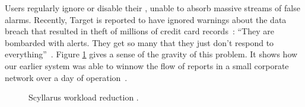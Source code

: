 Users regularly ignore or disable their {\idses}, unable to absorb
massive streams of false alarms.
Recently, Target is reported to have ignored warnings about the
data breach that resulted in theft of millions of credit
card records~\cite{TargetIgnoredIDS}:
``They are bombarded with alerts. They get so many that they just don't respond
to everything''~\cite{finkle14:_target}.
Figure
\ref{fig:workloadReduction} gives a sense of the gravity of this
problem. It shows how our earlier system was able to winnow
the 
flow of reports in a small corporate network over a day of operation~.
\begin{figure}[t]
  \centering
  \caption{Scyllarus workload reduction%
.}
  \label{fig:workloadReduction}
\end{figure}




